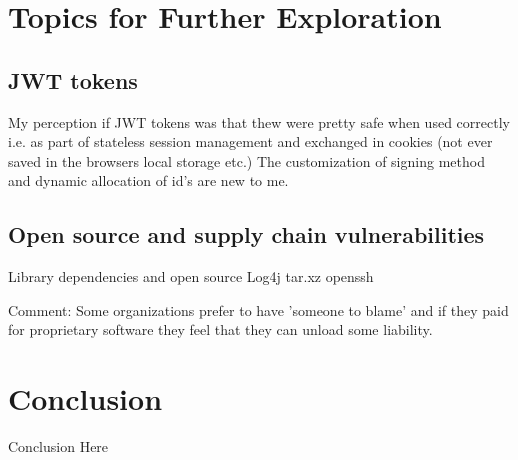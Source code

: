 \documentclass[
	letterpaper, %
	10pt, %
	unnumberedsections, %
	twoside, %
]{APAAssignment}
\begin{document}
\section{Topics for Further Exploration}

\subsection{JWT tokens}
My perception if JWT tokens was that thew were pretty safe when used correctly i.e. as part of stateless session management and exchanged in cookies (not ever saved in the browsers local storage etc.) The customization of signing method and dynamic allocation of id's are new to me.  

\subsection{Open source and supply chain vulnerabilities}
Library dependencies and open source
Log4j
tar.xz
openssh

Comment:
Some organizations prefer to have 'someone to blame' and if they paid for proprietary software they feel that they can unload some liability.


\section{Conclusion}
Conclusion Here

\clearpage
\printbibliography %





\appendix


\clearpage
\end{document}

